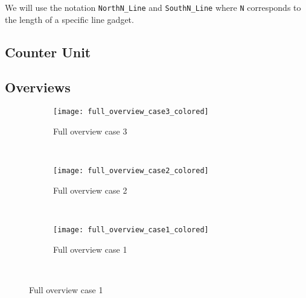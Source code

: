 We will use the notation {\tt NorthN\_Line} and {\tt SouthN\_Line} where {\tt N} corresponds to the length of a specific line gadget.


    
\subsection{ Counter Unit }

    
    
    
    
    

\subsection{Overviews}

\begin{figure}[H]
    \centering
    \begin{subfigure}[t]{0.3\textwidth}
        \centering
        \texttt{[image: full\_overview\_case3\_colored]}
        \caption{\label{fig:full_overview_case3_colored} Full overview case 3}
    \end{subfigure}%
    ~
    \begin{subfigure}[t]{0.3\textwidth}
        \centering
        \texttt{[image: full\_overview\_case2\_colored]}
        \caption{\label{fig:full_overview_case2_colored} Full overview case 2}
    \end{subfigure}%
    ~
    \begin{subfigure}[t]{0.3\textwidth}
        \centering
        \texttt{[image: full\_overview\_case1\_colored]}
        \caption{\label{fig:full_overview_case1_colored} Full overview case 1}
    \end{subfigure}%
    ~
\end{figure}